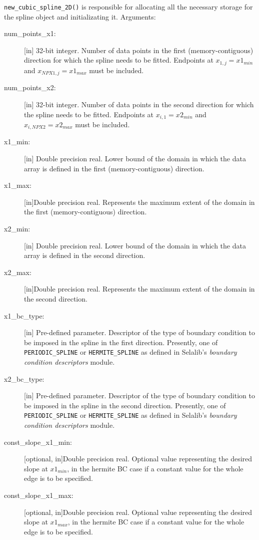 \documentclass[]{report}   %
\begin{document}
\begin{description}
	\item \verb+new_cubic_spline_2D()+ is responsible for allocating all the necessary storage for the spline object and initializating it. Arguments:

	\begin{description}
		\item[num\_points\_x1:] 
[in] 32-bit integer. Number of data points in the first (memory-contiguous) direction for which the spline needs to be fitted. Endpoints at $x_{1,j} = x1_{min}$ and $x_{NPX1,j} = x1_{max}$ must be included.
		\item[num\_points\_x2:]
[in] 32-bit integer. Number of data points in the second direction for which the spline needs to be fitted. Endpoints at $x_{i,1} = x2_{min}$ and $x_{i,NPX2} = x2_{max}$ must be included.
		\item[x1\_min:]
[in] Double precision real. Lower bound of the domain in which the data array is defined in the first (memory-contiguous) direction.
		\item[x1\_max:]
[in]Double precision real. Represents the maximum extent of the domain in the first (memory-contiguous) direction.
		\item[x2\_min:]
[in] Double precision real. Lower bound of the domain in which the data array is defined in the second direction.
		\item[x2\_max:]
[in]Double precision real. Represents the maximum extent of the domain in the second direction.
		\item[x1\_bc\_type:]
[in] Pre-defined parameter. Descriptor of the type of boundary condition to be imposed in the spline in the first direction. Presently, one of \verb+PERIODIC_SPLINE+ or \verb+HERMITE_SPLINE+ as defined in Selalib's \emph{boundary condition descriptors} module.
		\item[x2\_bc\_type:]
[in] Pre-defined parameter. Descriptor of the type of boundary condition to be imposed in the spline in the second direction. Presently, one of \verb+PERIODIC_SPLINE+ or \verb+HERMITE_SPLINE+ as defined in Selalib's \emph{boundary condition descriptors} module.
		\item[const\_slope\_x1\_min:]
	[optional, in]Double precision real. Optional value representing the desired slope at $x1_{min}$, in the hermite BC case if a constant value for the whole edge is to be specified.
		\item[const\_slope\_x1\_max:]
		[optional, in]Double precision real. Optional value representing the desired slope at $x1_{max}$, in the hermite BC case if a constant value for the whole edge is to be specified.

\end{description}
\end{description}
\end{document}
